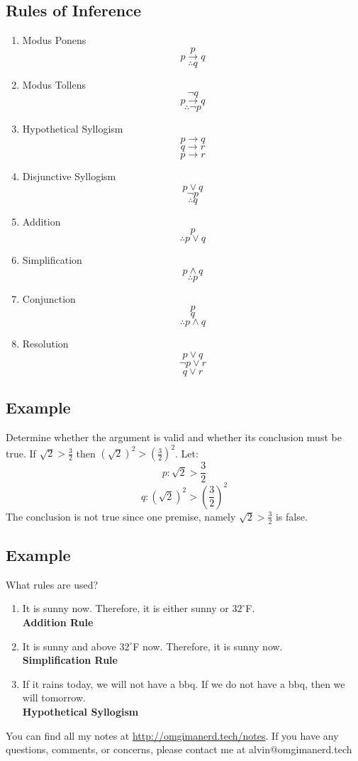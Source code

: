 \documentclass{math}
\begin{document}
\subsection*{Rules of Inference}
\begin{enumerate}
  \item Modus Ponens
    \[ p \]
    \[ p \to q \]
    \[ \therefore q\]
  \item Modus Tollens
    \[ \neg{q} \]
    \[ p \to q \]
    \[ \therefore \neg{p} \]
  \item Hypothetical Syllogism
    \[ p \to q \]
    \[ q \to r \]
    \[ p \to r \]
  \item Disjunctive Syllogism
    \[ p \vee q \]
    \[ \neg{p} \]
    \[ \therefore q \]
  \item Addition
    \[ p \]
    \[ \therefore p \vee q \]
  \item Simplification
    \[ p \wedge q \]
    \[ \therefore p \]
  \item Conjunction
    \[ p \]
    \[ q \]
    \[ \therefore p \wedge q \]
  \item Resolution
    \[ p \vee q \]
    \[ \neg{p} \vee r \]
    \[ q \vee r \]
\end{enumerate}

\subsection*{Example}
Determine whether the argument is valid and whether its conclusion must be true.
If \( \sqrt{2} > \frac{3}{2} \) then \( (\sqrt{2})^{2} > (\frac{3}{2})^{2} \).
Let:
\[ p: \sqrt{2} > \frac{3}{2} \]
\[ q: (\sqrt{2})^{2} > (\frac{3}{2})^{2} \]
The conclusion is not true since one premise, namely
\( \sqrt{2} > \frac{3}{2} \) is false.

\subsection*{Example}
What rules are used?
\begin{enumerate}
  \item It is sunny now. Therefore, it is either sunny or \( 32^{\circ} \)F. \\
    \textbf{Addition Rule}
  \item It is sunny and above \( 32^{\circ} \)F now. Therefore, it is sunny
    now. \\
    \textbf{Simplification Rule}
  \item If it rains today, we will not have a bbq. If we do not have a bbq,
    then we will tomorrow. \\
    \textbf{Hypothetical Syllogism}
\end{enumerate}

\begin{center}
  You can find all my notes at \url{http://omgimanerd.tech/notes}. If you have
  any questions, comments, or concerns, please contact me at
  alvin@omgimanerd.tech
\end{center}
\end{document}
